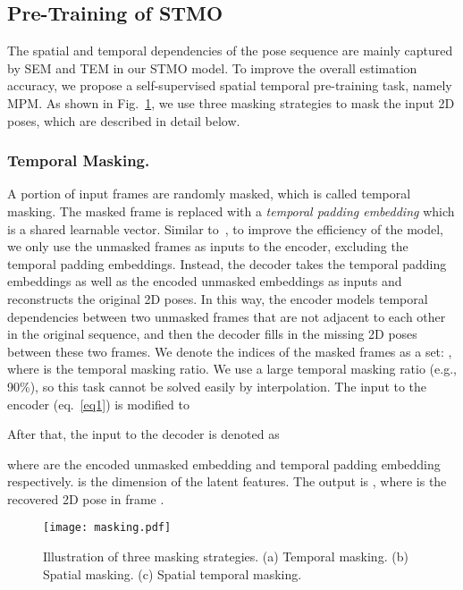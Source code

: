 \documentclass[]{llncs}
\begin{document}
\subsection{Pre-Training of STMO}
The spatial and temporal dependencies of the pose sequence are mainly captured by SEM and TEM in our STMO model. To improve the overall estimation accuracy, we propose a self-supervised spatial temporal pre-training task, namely MPM. As shown in Fig.~\ref{fig:masking}, we use three masking strategies to mask the input 2D poses, which are described in detail below.



\subsubsection{Temporal Masking.} 
A portion of input frames are randomly masked, which is called temporal masking. The masked frame is replaced with a \textit{temporal padding embedding}  which is a shared learnable vector. Similar to~\cite{he2022masked}, to improve the efficiency of the model, we only use the unmasked frames as inputs to the encoder, excluding the temporal padding embeddings. Instead, the decoder takes the temporal padding embeddings as well as the encoded unmasked embeddings as inputs and reconstructs the original 2D poses. In this way, the encoder models temporal dependencies between two unmasked frames that are not adjacent to each other in the original sequence, and then the decoder fills in the missing 2D poses between these two frames. We denote the indices of the masked frames as a set: , where  is the temporal masking ratio. We use a large temporal masking ratio (e.g., 90\%), so this task cannot be solved easily by interpolation. The input  to the encoder (eq.~\ref{eq1}) is modified to

After that, the input to the decoder is denoted as

where  are the encoded unmasked embedding and temporal padding embedding respectively.  is the dimension of the latent features. The output is , where  is the recovered 2D pose in frame . 

\begin{figure}[t]
\centering
\texttt{[image: masking.pdf]}
\vspace{-0.8cm}
\caption{Illustration of three masking strategies. (a) Temporal masking. (b) Spatial masking. (c) Spatial temporal masking. }
\vspace{-0.4cm}
\label{fig:masking}
\end{figure}
\end{document}
